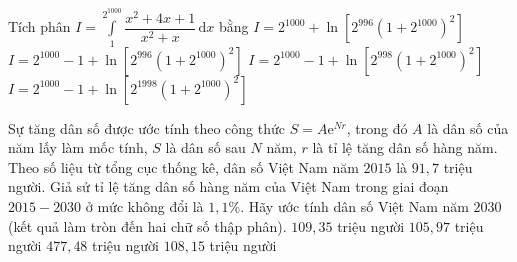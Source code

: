 \begin{ex}%
	Tích phân $I=\displaystyle\int\limits_1^{2^{1000}}{\dfrac{x^2+4x+1}{x^2+x}}\mathrm{\,d}x$ bằng
	\choice
	{$I=2^{1000}+\ln \left[2^{996}\left(1+2^{1000}\right)^2 \right]$}
	{$I=2^{1000}-1+\ln \left[2^{996} \left(1+2^{1000}\right)^2 \right]$}
	{\True $I=2^{1000}-1+\ln \left[2^{998} \left(1+2^{1000}\right)^2 \right]$}	
	{$I=2^{1000}-1+\ln \left[2^{1998}\left(1+2^{1000}\right)^2 \right]$}
\end{ex}

\begin{ex}%
	Sự tăng dân số được ước tính theo công thức $S=A \mathrm{e}^{Nr}$, trong đó $A$ là dân số của năm lấy làm mốc tính, $S$ là dân số sau $N$ năm, $r$ là tỉ lệ tăng dân số hàng năm. Theo số liệu từ tổng cục thống kê, dân số Việt Nam năm $2015$ là $91{,}7$ triệu người. Giả sử tỉ lệ tăng dân số hàng năm của Việt Nam trong giai đoạn $2015-2030$ ở mức không đổi là $1{,}1\%$. Hãy ước tính dân số Việt Nam năm $2030$ (kết quả làm tròn đến hai chữ số thập phân). 
	\choice
	{$109{,}35$ triệu người}		
	{$105{,}97$ triệu người}		
	{$477{,}48$ triệu người}		
	{\True $108{,}15$ triệu người}	
\end{ex}

